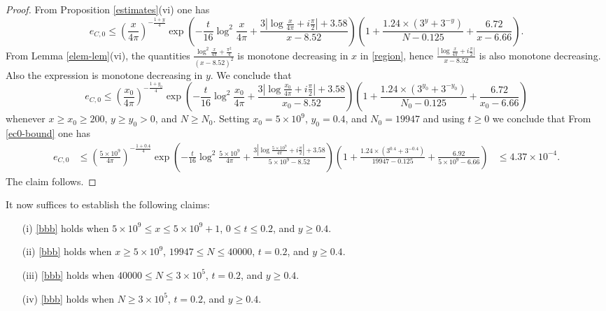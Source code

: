 \begin{proof}
From Proposition \ref{estimates}(vi) one has
$$ e_{C,0} \leq \left(\frac{x}{4\pi}\right)^{-\frac{1+y}{4}} \exp\left( - \frac{t}{16} \log^2 \frac{x}{4\pi} + \frac{3 |\log \frac{x}{4\pi} + i \frac{\pi}{2}|+3.58}{x-8.52} \right) \left(1 + \frac{1.24 \times (3^y+3^{-y})}{N-0.125} + \frac{6.72}{x-6.66}\right).$$
From Lemma \ref{elem-lem}(vi), the quantities $\frac{\log^2 \frac{x}{4\pi} + \frac{\pi^2}{4}}{(x-8.52)^2}$ is monotone decreasing in $x$ in \eqref{region}, hence $\frac{|\log \frac{x}{4\pi} + i \frac{\pi}{2}|}{x-8.52}$ is also monotone decreasing.  Also the expression is monotone decreasing in $y$. We conclude that
\begin{equation}\label{ec0-bound}
 e_{C,0} \leq \left(\frac{x_0}{4\pi}\right)^{-\frac{1+y_0}{4}} \exp\left( - \frac{t}{16} \log^2 \frac{x_0}{4\pi} + \frac{3 |\log \frac{x_0}{4\pi} + i \frac{\pi}{2}|+3.58}{x_0-8.52} \right) \left(1 + \frac{1.24 \times (3^{y_0}+3^{-y_0})}{N_0-0.125} + \frac{6.72}{x_0-6.66}\right)
\end{equation}
whenever $x \geq x_0 \geq 200$, $y \geq y_0 > 0$, and $N \geq N_0$.  Setting $x_0 = 5 \times 10^9$, $y_0 = 0.4$, and $N_0 = 19947$ and using $t \geq 0$ we conclude that
From \eqref{ec0-bound} one has
\begin{align*}
e_{C,0} &\leq \left(\frac{5 \times 10^9}{4\pi}\right)^{-\frac{1+0.4}{4}} \exp\left( - \frac{t}{16} \log^2 \frac{5 \times 10^9}{4\pi} + \frac{3 |\log \frac{5 \times 10^9}{4\pi} + i \frac{\pi}{2}|+3.58}{5 \times 10^9-8.52} \right) \left(1 + \frac{1.24 \times (3^{0.4}+3^{-0.4})}{19947-0.125} + \frac{6.92}{5 \times 10^9-6.66}\right)
&\leq 4.37 \times 10^{-4}.
\end{align*}
The claim follows.
\end{proof}


It now suffices to establish the following claims:

\begin{itemize}
\item[(i)]  \eqref{bbb} holds when $5 \times 10^9 \leq x \leq 5 \times 10^9+1$, $0 \leq t \leq 0.2$, and $y \geq 0.4$.
\item[(ii)]  \eqref{bbb} holds when $x \geq 5 \times 10^9$, $19947 \leq N \leq 40000$, $t = 0.2$, and $y \geq 0.4$.
\item[(iii)]  \eqref{bbb} holds when $40000 \leq N \leq 3 \times 10^5$, $t = 0.2$, and $y \geq 0.4$.
\item[(iv)]  \eqref{bbb} holds when $N \geq 3 \times 10^5$, $t = 0.2$, and $y \geq 0.4$.
\end{itemize}


